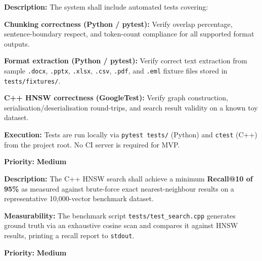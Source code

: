 \documentclass[12pt, a4paper]{article}
\begin{document}
\begin{tcolorbox}[enhanced, colback=white, colframe=ctGold,
    colbacktitle=ctLightGold, coltitle=ctPurple, boxrule=0.5pt,
    leftrule=4pt, arc=2mm, fonttitle=\large\bfseries,
    title={NFR-5: Unit \& Integration Testing},
    drop fuzzy shadow=black!5!white]
\begin{prolist}
    \item \textbf{Description:} The system shall include automated tests
    covering:
    \begin{prolist}
        \item \textbf{Chunking correctness (Python / pytest):} Verify
        overlap percentage, sentence-boundary respect, and token-count
        compliance for all supported format outputs.

        \item \textbf{Format extraction (Python / pytest):} Verify correct
        text extraction from sample \texttt{.docx}, \texttt{.pptx},
        \texttt{.xlsx}, \texttt{.csv}, \texttt{.pdf}, and \texttt{.eml}
        fixture files stored in \texttt{tests/fixtures/}.

        \item \textbf{C++ HNSW correctness (GoogleTest):} Verify graph
        construction, serialisation/deserialisation round-trips, and search
        result validity on a known toy dataset.
    \end{prolist}

    \item \textbf{Execution:} Tests are run locally via
    \texttt{pytest tests/} (Python) and \texttt{ctest} (C++) from the
    project root. No CI server is required for MVP.

    \item \textbf{Priority:} \textcolor{ctGold}{\textbf{Medium}}
\end{prolist}
\end{tcolorbox}

\begin{tcolorbox}[enhanced, colback=white, colframe=ctGold,
    colbacktitle=ctLightGold, coltitle=ctPurple, boxrule=0.5pt,
    leftrule=4pt, arc=2mm, fonttitle=\large\bfseries,
    title={NFR-6: HNSW Recall Benchmarks},
    drop fuzzy shadow=black!5!white]
\begin{prolist}
    \item \textbf{Description:} The C++ HNSW search shall achieve a minimum
    \textbf{Recall@10 of 95\%} as measured against brute-force exact
    nearest-neighbour results on a representative 10,000-vector benchmark
    dataset.

    \item \textbf{Measurability:} The benchmark script
    \texttt{tests/test\_search.cpp} generates ground truth via an exhaustive
    cosine scan and compares it against HNSW results, printing a recall
    report to \texttt{stdout}.

    \item \textbf{Priority:} \textcolor{ctGold}{\textbf{Medium}}
\end{prolist}
\end{tcolorbox}
\end{document}
